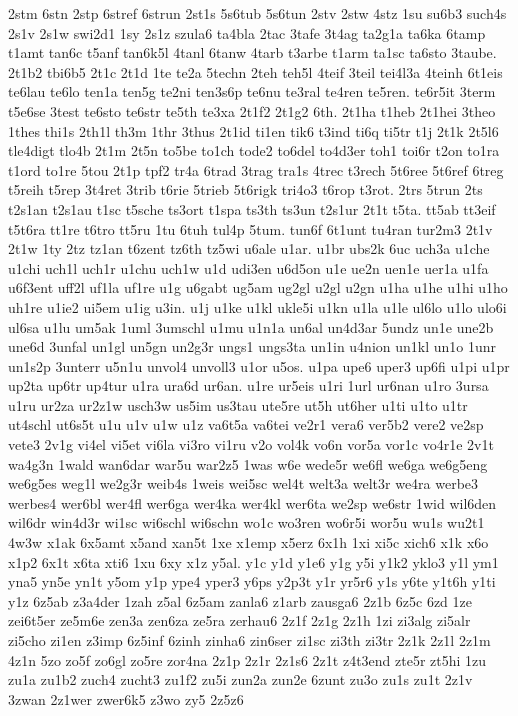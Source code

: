 {2stm
6stn
2stp
6stref
6strun
2st1s
5s6tub
5s6tun
2stv
2stw
4stz
1su
su6b3
such4s
2s1v
2s1w
swi2d1
1sy
2s1z
szula6
ta4bla
2tac
3tafe
3t4ag
ta2g1a
ta6ka
6tamp
t1amt
tan6c
t5anf
tan6k5l
4tanl
6tanw
4tarb
t3arbe
t1arm
ta1sc
ta6sto
3taube.
2t1b2
tbi6b5
2t1c
2t1d
1te
te2a
5techn
2teh
teh5l
4teif
3teil
tei4l3a
4teinh
6t1eis
te6lau
te6lo
ten1a
ten5g
te2ni
ten3s6p
te6nu
te3ral
te4ren
te5ren.
te6r5it
3term
t5e6se
3test
te6sto
te6str
te5th
te3xa
2t1f2
2t1g2
6th.
2t1ha
t1heb
2t1hei
3theo
1thes
thi1s
2th1l
th3m
1thr
3thus
2t1id
ti1en
tik6
t3ind
ti6q
ti5tr
t1j
2t1k
2t5l6
tle4digt
tlo4b
2t1m
2t5n
to5be
to1ch
tode2
to6del
to4d3er
toh1
toi6r
t2on
to1ra
t1ord
to1re
5tou
2t1p
tpf2
tr4a
6trad
3trag
tra1s
4trec
t3rech
5t6ree
5t6ref
6treg
t5reih
t5rep
3t4ret
3trib
t6rie
5trieb
5t6rigk
tri4o3
t6rop
t3rot.
2trs
5trun
2ts
t2s1an
t2s1au
t1sc
t5sche
ts3ort
t1spa
ts3th
ts3un
t2s1ur
2t1t
t5ta.
tt5ab
tt3eif
t5t6ra
tt1re
t6tro
tt5ru
1tu
6tuh
tul4p
5tum.
tun6f
6t1unt
tu4ran
tur2m3
2t1v
2t1w
1ty
2tz
tz1an
t6zent
tz6th
tz5wi
u6ale
u1ar.
u1br
ubs2k
6uc
uch3a
u1che
u1chi
uch1l
uch1r
u1chu
uch1w
u1d
udi3en
u6d5on
u1e
ue2n
uen1e
uer1a
u1fa
u6f3ent
uff2l
uf1la
uf1re
u1g
u6gabt
ug5am
ug2gl
u2gl
u2gn
u1ha
u1he
u1hi
u1ho
uh1re
u1ie2
ui5em
u1ig
u3in.
u1j
u1ke
u1kl
ukle5i
u1kn
u1la
u1le
ul6lo
u1lo
ulo6i
ul6sa
u1lu
um5ak
1uml
3umschl
u1mu
u1n1a
un6al
un4d3ar
5undz
un1e
une2b
une6d
3unfal
un1gl
un5gn
un2g3r
ungs1
ungs3ta
un1in
u4nion
un1kl
un1o
1unr
un1s2p
3unterr
u5n1u
unvol4
unvoll3
u1or
u5os.
u1pa
upe6
uper3
up6fi
u1pi
u1pr
up2ta
up6tr
up4tur
u1ra
ura6d
ur6an.
u1re
ur5eis
u1ri
1url
ur6nan
u1ro
3ursa
u1ru
ur2za
ur2z1w
usch3w
us5im
us3tau
ute5re
ut5h
ut6her
u1ti
u1to
u1tr
ut4schl
ut6s5t
u1u
u1v
u1w
u1z
va6t5a
va6tei
ve2r1
vera6
ver5b2
vere2
ve2sp
vete3
2v1g
vi4el
vi5et
vi6la
vi3ro
vi1ru
v2o
vol4k
vo6n
vor5a
vor1c
vo4r1e
2v1t
wa4g3n
1wald
wan6dar
war5u
war2z5
1was
w6e
wede5r
we6fl
we6ga
we6g5eng
we6g5es
weg1l
we2g3r
weib4s
1weis
wei5sc
wel4t
welt3a
welt3r
we4ra
werbe3
werbes4
wer6bl
wer4fl
wer6ga
wer4ka
wer4kl
wer6ta
we2sp
we6str
1wid
wil6den
wil6dr
win4d3r
wi1sc
wi6schl
wi6schn
wo1c
wo3ren
wo6r5i
wor5u
wu1s
wu2t1
4w3w
x1ak
6x5amt
x5and
xan5t
1xe
x1emp
x5erz
6x1h
1xi
xi5c
xich6
x1k
x6o
x1p2
6x1t
x6ta
xti6
1xu
6xy
x1z
y5al.
y1c
y1d
y1e6
y1g
y5i
y1k2
yklo3
y1l
ym1
yna5
yn5e
yn1t
y5om
y1p
ype4
yper3
y6ps
y2p3t
y1r
yr5r6
y1s
y6te
y1t6h
y1ti
y1z
6z5ab
z3a4der
1zah
z5al
6z5am
zanla6
z1arb
zausga6
2z1b
6z5c
6zd
1ze
zei6t5er
ze5m6e
zen3a
zen6za
ze5ra
zerhau6
2z1f
2z1g
2z1h
1zi
zi3alg
zi5alr
zi5cho
zi1en
z3imp
6z5inf
6zinh
zinha6
zin6ser
zi1sc
zi3th
zi3tr
2z1k
2z1l
2z1m
4z1n
5zo
zo5f
zo6gl
zo5re
zor4na
2z1p
2z1r
2z1s6
2z1t
z4t3end
zte5r
zt5hi
1zu
zu1a
zu1b2
zuch4
zucht3
zu1f2
zu5i
zun2a
zun2e
6zunt
zu3o
zu1s
zu1t
2z1v
3zwan
2z1wer
zwer6k5
z3wo
zy5
2z5z6}


